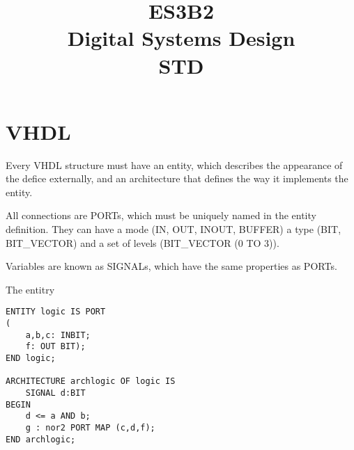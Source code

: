 \documentclass[a4paper,twocolumn]{article}
\title{ES3B2 \\ Digital Systems Design\\ STD}
\begin{document}
	\section{VHDL}
		Every VHDL structure must have an entity,
		which describes the appearance of the defice externally,
		and an architecture that defines the way it implements the entity.

		All connections are PORTs, which must be uniquely named in the entity definition.
		They can have a mode (IN, OUT, INOUT, BUFFER)
		a type (BIT, BIT\_VECTOR)
		and a set of levels (BIT\_VECTOR (0 TO 3)).

		Variables are known as  SIGNALs, which have the same properties as PORTs.

		The entitry

\begin{lstlisting}
ENTITY logic IS PORT
(
	a,b,c: INBIT;
	f: OUT BIT);
END logic;

ARCHITECTURE archlogic OF logic IS
	SIGNAL d:BIT
BEGIN
	d <= a AND b;
	g : nor2 PORT MAP (c,d,f);
END archlogic;
\end{lstlisting}
\end{document}
